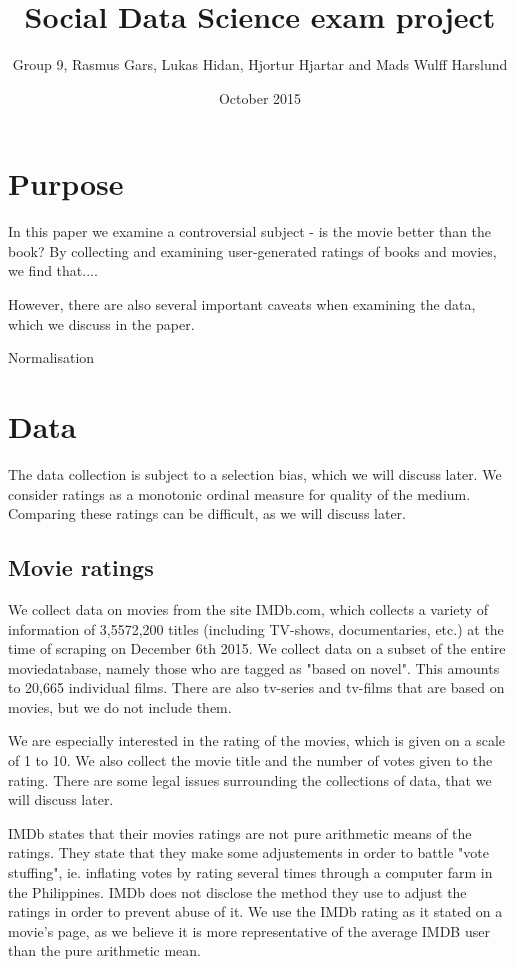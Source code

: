 \documentclass[12pt]{article}
\title{Social Data Science exam project}
\author{Group 9, Rasmus Gars, Lukas Hidan, Hjortur Hjartar and Mads Wulff Harslund}
\date{October 2015}
\begin{document}
\maketitle

	\section{Purpose} %
	\label{sec:problem_1}
	In this paper we examine a controversial subject - is the movie better than the book? By collecting and examining user-generated ratings of books and movies, we find that....

	However, there are also several important caveats when examining the data, which we discuss in the paper. 

	Normalisation 



\section{Data} %
	\label{sec:data}


The data collection is subject to a selection bias, which we will discuss later.
We consider ratings as a monotonic ordinal measure for quality of the medium. Comparing these ratings can be difficult, as we will discuss later.


\subsection{Movie ratings}
We collect data on movies from the site IMDb.com, which collects a variety of information  of 3,5572,200 titles (including TV-shows, documentaries, etc.) at the time of scraping on December 6th 2015. We collect data on a subset of the entire moviedatabase, namely those who are tagged as "based on novel". This amounts to 20,665 individual films. There are also tv-series and tv-films that are based on movies, but we do not include them.

We are especially interested in the rating of the movies, which is given on a scale of 1 to 10. We also collect the movie title and the number of votes given to the rating. There are some legal issues surrounding the collections of data, that we will discuss later.

IMDb states that their movies ratings are not pure arithmetic means of the ratings. They state that they make some adjustements in order to battle "vote stuffing", ie. inflating votes by rating several times through a computer farm in the Philippines. IMDb does not disclose the method they use to adjust the ratings in order to prevent abuse of it. We use the IMDb rating as it stated on a movie's page, as we believe it is more representative of the average IMDB user than the pure arithmetic mean.
\end{document}
